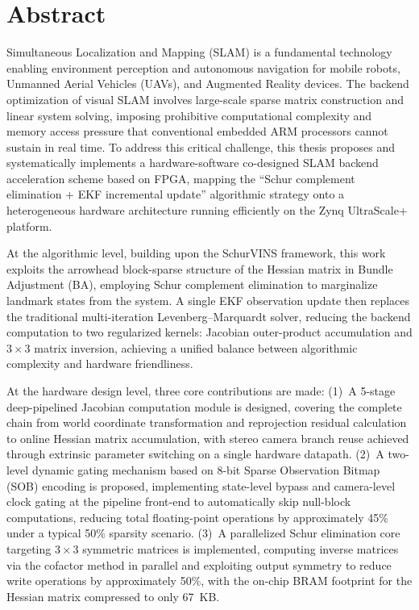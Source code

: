 \intobmk\chapter*{Abstract}%

Simultaneous Localization and Mapping (SLAM) is a fundamental technology enabling environment perception and autonomous navigation for mobile robots, Unmanned Aerial Vehicles (UAVs), and Augmented Reality devices. The backend optimization of visual SLAM involves large-scale sparse matrix construction and linear system solving, imposing prohibitive computational complexity and memory access pressure that conventional embedded ARM processors cannot sustain in real time. To address this critical challenge, this thesis proposes and systematically implements a hardware-software co-designed SLAM backend acceleration scheme based on FPGA, mapping the ``Schur complement elimination + EKF incremental update'' algorithmic strategy onto a heterogeneous hardware architecture running efficiently on the Zynq UltraScale+ platform.

At the algorithmic level, building upon the SchurVINS framework, this work exploits the arrowhead block-sparse structure of the Hessian matrix in Bundle Adjustment (BA), employing Schur complement elimination to marginalize landmark states from the system. A single EKF observation update then replaces the traditional multi-iteration Levenberg--Marquardt solver, reducing the backend computation to two regularized kernels: Jacobian outer-product accumulation and $3 \times 3$ matrix inversion, achieving a unified balance between algorithmic complexity and hardware friendliness.

At the hardware design level, three core contributions are made: (1)~A 5-stage deep-pipelined Jacobian computation module is designed, covering the complete chain from world coordinate transformation and reprojection residual calculation to online Hessian matrix accumulation, with stereo camera branch reuse achieved through extrinsic parameter switching on a single hardware datapath. (2)~A two-level dynamic gating mechanism based on 8-bit Sparse Observation Bitmap (SOB) encoding is proposed, implementing state-level bypass and camera-level clock gating at the pipeline front-end to automatically skip null-block computations, reducing total floating-point operations by approximately 45\% under a typical 50\% sparsity scenario. (3)~A parallelized Schur elimination core targeting $3 \times 3$ symmetric matrices is implemented, computing inverse matrices via the cofactor method in parallel and exploiting output symmetry to reduce write operations by approximately 50\%, with the on-chip BRAM footprint for the Hessian matrix compressed to only 67~KB.

